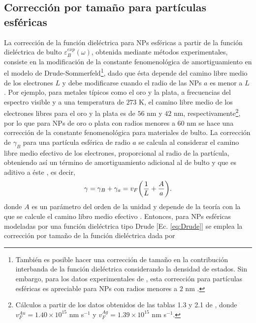 \subsection{Corrección por tamaño para partículas esféricas}
\label{ssection:CorreccionTamano}

La corrección de la función dieléctrica para NPs esféricas a partir de la función dieléctrica de bulto $\varepsilon_B^{exp}(\omega)$, obtenida mediante métodos experimentales, consiste en la modificación de la constante fenomenológica de amortiguamiento en el modelo de Drude-Sommerfeld\footnote{También es posible hacer una corrección de tamaño en la contribución interbanda de la función dieléctrica considerando la densidad de estados. Sin embargo, para los datos experimentales de \cite{johnson1972constants}, esta corrección para partículas esféricas es apreciable para NPs con radios menores a $2$ nm \cite{mendoza2014determination}.}, dado que ésta depende del camino libre medio de los electrones $L$ y debe modificarse cuando el radio de las NPs $a$ es menor a $L$ \cite{kreibig1995clusters}. Por ejemplo, para metales típicos  como el oro y la plata, a frecuencias del espectro visible y a una temperatura de $273$ K, el camino libre medio de los electrones libres para el oro y la plata es  de $56$ nm  y $42$ nm, respectivamente\footnote{Cálculos a partir de los datos obtenidos de las tablas 1.3 y 2.1 de \cite{ashcroft1976solid}, donde $v_F^{Au} = 1.40\times 10^{15}$ nm s$^{-1}$ y $v_F^{Ag}=1.39\times 10^{15}$ nm s$^{-1}$.}, por lo que para NPs de oro o plata con radios menores a $60$ nm se hace una corrección de la constante fenomenológica para materiales de bulto. La corrección de $\gamma_B $ para una partícula esférica de radio $a$ se calcula al considerar el camino libre medio efectivo de los electrones, proporcional al radio de la partícula, obteniendo así un término de amortiguamiento adicional al de bulto y que es aditivo a éste \cite{kreibig1995clusters}, es decir,
%
	\begin{align*}
	 \gamma = \gamma_B+ \gamma_a = v_F \qty(\frac{1}{L}+\frac{A}{a}). 
	\end{align*}
%
donde $A$ es un parámetro del orden de la unidad \cite{noguez2007surface,mendoza2014determination} y depende de la teoría con la que se calcule el camino libro medio efectivo \cite{kreibig1995clusters}.  Entonces, para NPs esféricas modeladas por una función dieléctrica tipo Drude [Ec.  \eqref{eq:Drude}] se emplea  la corrección por tamaño de la función dieléctrica dada por 
